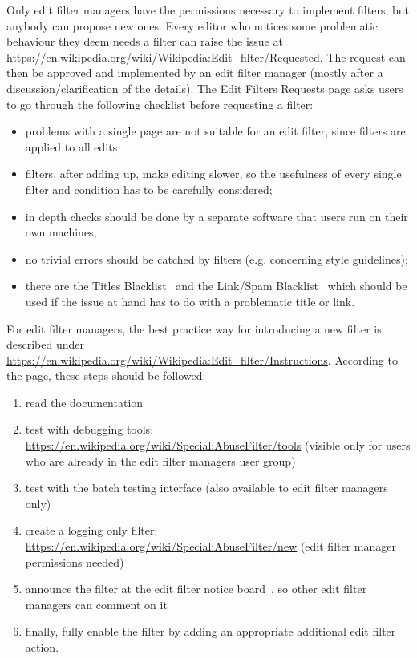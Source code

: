 Only edit filter managers have the permissions necessary to implement filters, but anybody can propose new ones.
Every editor who notices some problematic behaviour they deem needs a filter can raise the issue at \url{https://en.wikipedia.org/wiki/Wikipedia:Edit_filter/Requested}.
The request can then be approved and implemented by an edit filter manager (mostly after a discussion/clarification of the details).
The Edit Filters Requests page asks users to go through the following checklist before requesting a filter:
\begin{itemize}
    \item problems with a single page are not suitable for an edit filter, since filters are applied to all edits;
    \item filters, after adding up, make editing slower, so the usefulness of every single filter and condition has to be carefully considered;
    \item in depth checks should be done by a separate software that users run on their own machines;
    \item no trivial errors should be catched by filters (e.g. concerning style guidelines);
    \item there are the Titles Blacklist~\cite{Mediawiki:TitleBlacklist} and the Link/Spam Blacklist~\cite{Mediawiki:SpamBlacklist} which should be used if the issue at hand has to do with a problematic title or link.
\end{itemize}

For edit filter managers, the best practice way for introducing a new filter is described under \url{https://en.wikipedia.org/wiki/Wikipedia:Edit_filter/Instructions}.
According to the page, these steps should be followed:
\begin{enumerate}
    \item read the documentation~\cite{Mediawiki:AbuseFilterRules}
    \item test with debugging tools: \url{https://en.wikipedia.org/wiki/Special:AbuseFilter/tools} (visible only for users who are already in the edit filter managers user group)
    \item test with the batch testing interface (also available to edit filter managers only)
    \item create a logging only filter: \url{https://en.wikipedia.org/wiki/Special:AbuseFilter/new} (edit filter manager permissions needed)
    \item announce the filter at the edit filter notice board~\cite{Wikipedia:EditFilterNoticeboard}, so other edit filter managers can comment on it
    \item finally, fully enable the filter by adding an appropriate additional edit filter action.
\end{enumerate}

